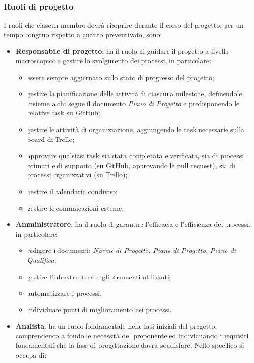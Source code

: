 \subsubsection{Ruoli di progetto}
I ruoli che ciascun membro dovrà ricoprire durante il corso del progetto, per un tempo congruo rispetto a quanto preventivato, sono:
\begin{itemize}
  \item \textbf{Responsabile di progetto}: ha il ruolo di guidare il progetto a livello macroscopico e gestire lo svolgimento dei processi, in particolare:
  \begin{itemize}
    \item essere sempre aggiornato sullo stato di progresso del progetto;
    \item gestire la pianificazione delle attività di ciascuna milestone, definendole insieme a chi segue il documento \textit{Piano di Progetto} e predisponendo le relative task su GitHub;
    \item gestire le attività di organizzazione, aggiungendo le task necessarie sulla board di Trello;
    \item approvare qualsiasi task sia stata completata e verificata, sia di processi primari e di supporto (su GitHub, approvando le pull request), sia di processi organizzativi (su Trello);
    \item gestire il calendario condiviso;
    \item gestire le comunicazioni esterne.
  \end{itemize}
  \item \textbf{Amministratore}: ha il ruolo di garantire l'efficacia e l'efficienza dei processi, in particolare:
  \begin{itemize}
    \item redigere i documenti: \textit{Norme di Progetto}, \textit{Piano di Progetto}, \textit{Piano di Qualifica};
    \item gestire l'infrastruttura e gli strumenti utilizzati;
    \item automatizzare i processi;
    \item individuare punti di miglioramento nei processi.
  \end{itemize}
  \item \textbf{Analista}: ha un ruolo fondamentale nelle fasi iniziali del progetto, comprendendo a fondo le necessità del proponente ed individuando i requisiti fondamentali che la fase di progettazione dovrà soddisfare. Nello specifico si occupa di:
  \begin{itemize}

\end{itemize}
\end{itemize}
